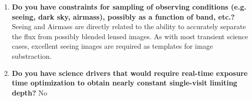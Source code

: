 \begin{enumerate}
\item \textbf{Do you have constraints for sampling of observing conditions (e.g. seeing, dark sky,
airmass), possibly as a function of band, etc.?} Seeing and Airmass are directly related to the ability to accurately separate the flux from possibly blended lensed images. As with most transient science cases, excellent seeing images are required as templates for image substraction.

\item \textbf{Do you have science drivers that would require real-time exposure time optimization 
to obtain nearly constant single-visit limiting depth?} No

\end{enumerate}






%
%
%
%

\navigationbar
